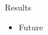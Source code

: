 \documentclass[overlay-policy=strict]{beamer-accessibility}
\begin{document}
\begin{frame}{Results}
\begin{itemize}\item<2-> Future\end{itemize}
\end{frame}
\end{document}
